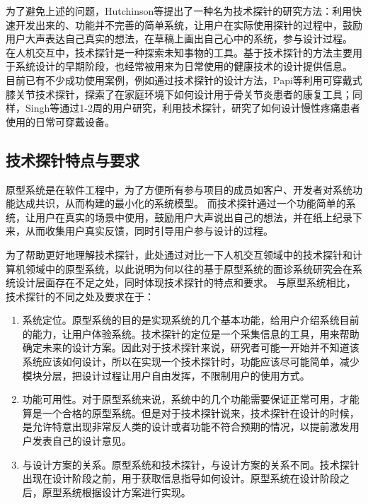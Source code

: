 为了避免上述的问题，Hutchinson等\cite{Hutchinson2003Technology}提出了一种名为技术探针的研究方法：利用快速开发出来的、功能并不完善的简单系统，让用户在实际使用探针的过程中，鼓励用户大声表达自己真实的想法，在草稿上画出自己心中的系统，参与设计过程。
在人机交互中，技术探针是一种探索未知事物的工具。基于技术探针的方法主要用于系统设计的早期阶段\cite{turmo2020training}，也经常被用来为日常使用的健康技术的设计提供信息。
目前已有不少成功使用案例，例如通过技术探针的设计方法，Papi等\cite{papi2015knee}利用可穿戴式膝关节技术探针，探索了在家庭环境下如何设计用于骨关节炎患者的康复工具；同样，Singh等\cite{singh2017supporting}通过1-2周的用户研究，利用技术探针，研究了如何设计慢性疼痛患者使用的日常可穿戴设备。

\subsection{技术探针特点与要求}

原型系统是在软件工程中，为了方便所有参与项目的成员如客户、开发者对系统功能达成共识，从而构建的最小化的系统模型。
而技术探针通过一个功能简单的系统，让用户在真实的场景中使用，鼓励用户大声说出自己的想法，并在纸上纪录下来，从而收集用户真实反馈，同时引导用户参与设计的过程。

为了帮助更好地理解技术探针，此处通过对比一下人机交互领域中的技术探针和计算机领域中的原型系统，以此说明为何以往的基于原型系统的面诊系统研究会在系统设计层面存在不足之处，同时体现技术探针的特点和要求。
与原型系统相比，技术探针的不同之处及要求在于：
\begin{enumerate}
    \item 系统定位。原型系统的目的是实现系统的几个基本功能，给用户介绍系统目前的能力，让用户体验系统。技术探针的定位是一个采集信息的工具，用来帮助确定未来的设计方案。因此对于技术探针来说，研究者可能一开始并不知道该系统应该如何设计，所以在实现一个技术探针时，功能应该尽可能简单，减少模块分层，把设计过程让用户自由发挥，不限制用户的使用方式。

    \item 功能可用性。对于原型系统来说，系统中的几个功能需要保证正常可用，才能算是一个合格的原型系统。但是对于技术探针说来，技术探针在设计的时候，是允许特意出现非常反人类的设计或者功能不符合预期的情况，以提前激发用户发表自己的设计意见。

    \item 与设计方案的关系。原型系统和技术探针，与设计方案的关系不同。技术探针出现在设计阶段之前，用于获取信息指导如何设计。原型系统在设计阶段之后，原型系统根据设计方案进行实现。
\end{enumerate}

